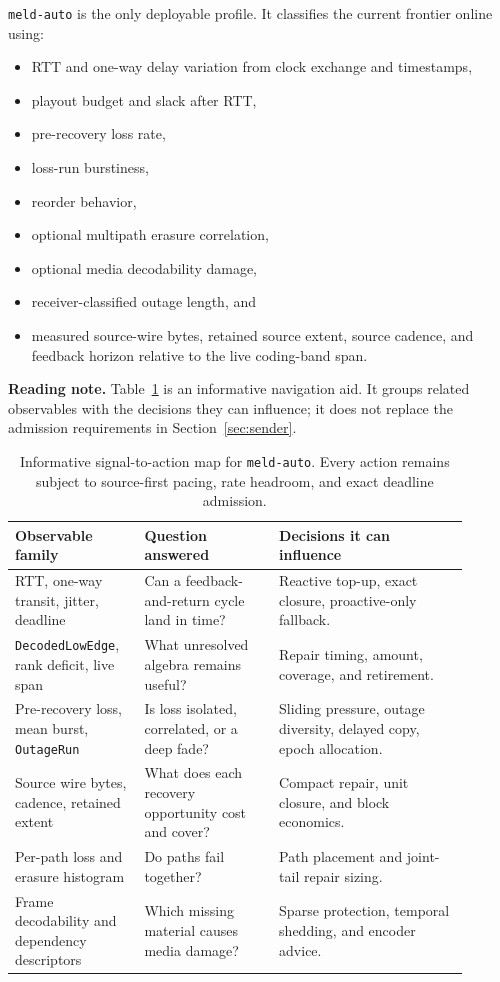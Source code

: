 \documentclass[11pt]{article}
\newcommand{\code}[1]{\ifmmode\text{\texttt{#1}}\else\texttt{#1}\fi}
\newcommand{\field}[1]{\code{#1}}
\newcommand{\readingnote}[1]{%
  \par\medskip\noindent
  \colorbox{meldpaper}{%
    \parbox{\dimexpr\linewidth-2\fboxsep\relax}{%
      \small\textbf{\textcolor{meldblue}{Reading note.}} #1}}
  \par\medskip}
\begin{document}
\code{meld-auto} is the only deployable profile. It classifies the current
frontier online using:

\begin{itemize}
\item RTT and one-way delay variation from clock exchange and timestamps,
\item playout budget and slack after RTT,
\item pre-recovery loss rate,
\item loss-run burstiness,
\item reorder behavior,
\item optional multipath erasure correlation,
\item optional media decodability damage,
\item receiver-classified outage length, and
\item measured source-wire bytes, retained source extent, source cadence, and
      feedback horizon relative to the live coding-band span.
\end{itemize}

\readingnote{Table~\ref{tab:signal-action-map} is an informative navigation aid.
It groups related observables with the decisions they can influence; it does not
replace the admission requirements in Section~\ref{sec:sender}.}

\begin{table}[htbp]
\centering
\renewcommand{\arraystretch}{1.18}
\begin{tabular}{>{\raggedright\arraybackslash}p{0.25\linewidth}
                >{\raggedright\arraybackslash}p{0.27\linewidth}
                >{\raggedright\arraybackslash}p{0.38\linewidth}}
\toprule
Observable family & Question answered & Decisions it can influence \\
\midrule
RTT, one-way transit, jitter, deadline & Can a feedback-and-return cycle land in time? &
Reactive top-up, exact closure, proactive-only fallback. \\
\field{DecodedLowEdge}, rank deficit, live span & What unresolved algebra remains useful? &
Repair timing, amount, coverage, and retirement. \\
Pre-recovery loss, mean burst, \field{OutageRun} & Is loss isolated, correlated, or a deep fade? &
Sliding pressure, outage diversity, delayed copy, epoch allocation. \\
Source wire bytes, cadence, retained extent & What does each recovery opportunity cost and cover? &
Compact repair, unit closure, and block economics. \\
Per-path loss and erasure histogram & Do paths fail together? &
Path placement and joint-tail repair sizing. \\
Frame decodability and dependency descriptors & Which missing material causes media damage? &
Sparse protection, temporal shedding, and encoder advice. \\
\bottomrule
\end{tabular}
\caption{Informative signal-to-action map for \code{meld-auto}. Every action
remains subject to source-first pacing, rate headroom, and exact deadline
admission.}
\label{tab:signal-action-map}
\end{table}
\FloatBarrier
\end{document}
